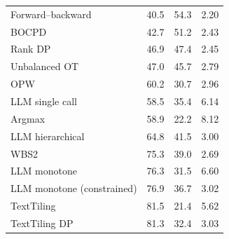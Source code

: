 \begin{table}[t]
\begin{tabular*}{\linewidth}{@{\extracolsep{\fill}}lrrr@{}}
Forward--backward & 40.5 & 54.3 & 2.20 \\
BOCPD & 42.7 & 51.2 & 2.43 \\
Rank DP & 46.9 & 47.4 & 2.45 \\
Unbalanced OT & 47.0 & 45.7 & 2.79 \\
OPW & 60.2 & 30.7 & 2.96 \\
LLM single call & 58.5 & 35.4 & 6.14 \\
Argmax & 58.9 & 22.2 & 8.12 \\
LLM hierarchical & 64.8 & 41.5 & 3.00 \\
WBS2 & 75.3 & 39.0 & 2.69 \\
LLM monotone & 76.3 & 31.5 & 6.60 \\
LLM monotone (constrained) & 76.9 & 36.7 & 3.02 \\
TextTiling & 81.5 & 21.4 & 5.62 \\
TextTiling DP & 81.3 & 32.4 & 3.03 \\
\bottomrule
\end{tabular*}
\end{table}

